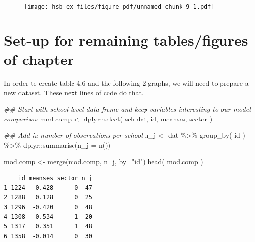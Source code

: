 \documentclass[
  letterpaper,
  DIV=11,
  numbers=noendperiod]{scrreprt}
\newenvironment{Shaded}{\begin{snugshade}}{\end{snugshade}}
\newcommand{\AttributeTok}[1]{\textcolor[rgb]{0.49,0.56,0.16}{#1}}
\newcommand{\DocumentationTok}[1]{\textcolor[rgb]{0.73,0.13,0.13}{\textit{#1}}}
\newcommand{\FunctionTok}[1]{\textcolor[rgb]{0.02,0.16,0.49}{#1}}
\newcommand{\NormalTok}[1]{\textcolor[rgb]{0.00,0.44,0.13}{#1}}
\newcommand{\OtherTok}[1]{\textcolor[rgb]{0.00,0.44,0.13}{#1}}
\newcommand{\SpecialCharTok}[1]{\textcolor[rgb]{0.25,0.44,0.63}{#1}}
\newcommand{\StringTok}[1]{\textcolor[rgb]{0.25,0.44,0.63}{#1}}
\begin{document}
\begin{figure}[H]

{\centering \texttt{[image: hsb\_ex\_files/figure-pdf/unnamed-chunk-9-1.pdf]}

}

\end{figure}

\hypertarget{set-up-for-remaining-tablesfigures-of-chapter}{%
\section{Set-up for remaining tables/figures of
chapter}\label{set-up-for-remaining-tablesfigures-of-chapter}}

In order to create table 4.6 and the following 2 graphs, we will need to
prepare a new dataset. These next lines of code do that.

\begin{Shaded}
\begin{Highlighting}[]
\DocumentationTok{\#\# Start with school level data frame and keep variables interesting to our model comparison}
\NormalTok{mod.comp }\OtherTok{\textless{}{-}}\NormalTok{ dplyr}\SpecialCharTok{::}\FunctionTok{select}\NormalTok{( sch.dat, id, meanses, sector )}

\DocumentationTok{\#\# Add in number of observations per school }
\NormalTok{n\_j }\OtherTok{\textless{}{-}}\NormalTok{ dat }\SpecialCharTok{\%\textgreater{}\%} \FunctionTok{group\_by}\NormalTok{( id ) }\SpecialCharTok{\%\textgreater{}\%}
\NormalTok{  dplyr}\SpecialCharTok{::}\FunctionTok{summarise}\NormalTok{(}\AttributeTok{n\_j =} \FunctionTok{n}\NormalTok{())}

\NormalTok{mod.comp }\OtherTok{\textless{}{-}} \FunctionTok{merge}\NormalTok{(mod.comp, n\_j, }\AttributeTok{by=}\StringTok{"id"}\NormalTok{)}
\FunctionTok{head}\NormalTok{( mod.comp )}
\end{Highlighting}
\end{Shaded}

\begin{verbatim}
    id meanses sector n_j
1 1224  -0.428      0  47
2 1288   0.128      0  25
3 1296  -0.420      0  48
4 1308   0.534      1  20
5 1317   0.351      1  48
6 1358  -0.014      0  30
\end{verbatim}
\end{document}
